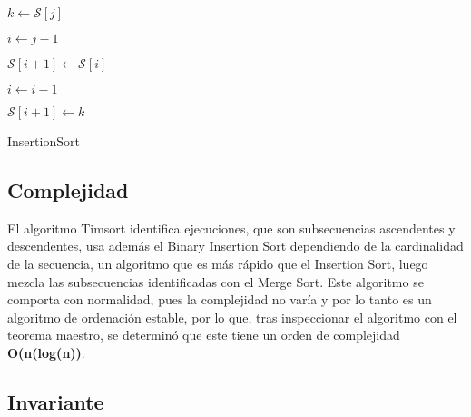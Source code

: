 \documentclass[a4paper]{article}
\theoremstyle{plain}
\theoremstyle{definition}
\begin{document}
	\begin{algorithm}[H]
    \begin{algorithmic}[1]



            \State$k\leftarrow\mathcal{S}\left[j\right]$

            \State$i\leftarrow j-1$


                \State$\mathcal{S}\left[i+1\right]\leftarrow\mathcal{S}\left[i\right]$

                \State$i\leftarrow i-1$

            \EndWhile

            \State$\mathcal{S}\left[i+1\right]\leftarrow k$

        \EndFor

        \EndProcedure

    \end{algorithmic}

\caption{InsertionSort}

\end{algorithm} 	
	\subsection{Complejidad}
	
	El algoritmo Timsort identifica ejecuciones, que son subsecuencias ascendentes y descendentes, usa además el Binary Insertion Sort dependiendo de la cardinalidad de la secuencia, un algoritmo que es más rápido que el Insertion Sort, luego mezcla las subsecuencias identificadas con el Merge Sort. Este algoritmo se comporta con normalidad, pues la complejidad no varía y por lo tanto es un algoritmo de ordenación estable, por lo que, tras inspeccionar el algoritmo con el teorema maestro, se determinó que este tiene un orden de complejidad \textbf{O(n(log(n))}.
	
	\subsection{Invariante}
	
\end{document}
